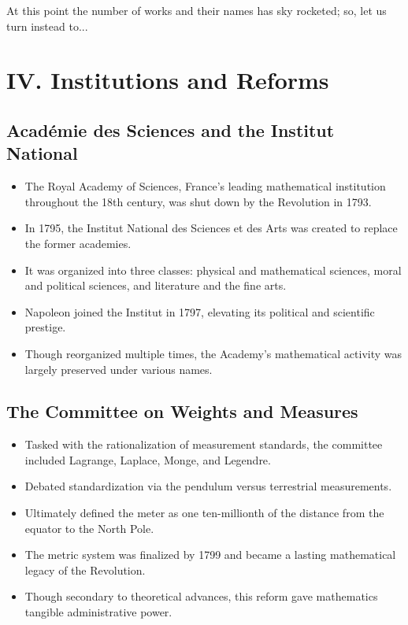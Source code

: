 \documentclass[9pt]{article}
\begin{document}
\vspace{1em}

At this point the number of works and their names has sky rocketed; so, let us turn instead to...

\newpage

\section*{IV. Institutions and Reforms}

\subsection*{Académie des Sciences and the Institut National}
\begin{itemize}
  \item The Royal Academy of Sciences, France’s leading mathematical institution throughout the 18th century, was shut down by the Revolution in 1793.
  \item In 1795, the Institut National des Sciences et des Arts was created to replace the former academies.
  \item It was organized into three classes: physical and mathematical sciences, moral and political sciences, and literature and the fine arts.
  \item Napoleon joined the Institut in 1797, elevating its political and scientific prestige.
  \item Though reorganized multiple times, the Academy’s mathematical activity was largely preserved under various names.
\end{itemize}

\subsection*{The Committee on Weights and Measures}
\begin{itemize}
  \item Tasked with the rationalization of measurement standards, the committee included Lagrange, Laplace, Monge, and Legendre.
  \item Debated standardization via the pendulum versus terrestrial measurements.
  \item Ultimately defined the meter as one ten-millionth of the distance from the equator to the North Pole.
  \item The metric system was finalized by 1799 and became a lasting mathematical legacy of the Revolution.
  \item Though secondary to theoretical advances, this reform gave mathematics tangible administrative power.
\end{itemize}
\end{document}

